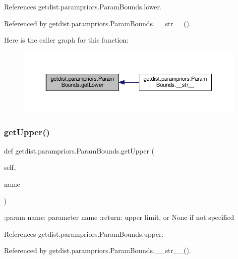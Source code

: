References getdist.\+parampriors.\+Param\+Bounds.\+lower.



Referenced by getdist.\+parampriors.\+Param\+Bounds.\+\_\+\+\_\+str\+\_\+\+\_\+().

Here is the caller graph for this function\+:
\nopagebreak
\begin{figure}[H]
\begin{center}
\leavevmode
\includegraphics[width=350pt]{classgetdist_1_1parampriors_1_1ParamBounds_ad03ae510837b1fccf9ff40264b2c6e90_icgraph}
\end{center}
\end{figure}
\mbox{\label{classgetdist_1_1parampriors_1_1ParamBounds_a9b653d54efcc1d19bebd8aa0a4cb2c9a}} 
\subsubsection{\texorpdfstring{get\+Upper()}{getUpper()}}
{\footnotesize\ttfamily def getdist.\+parampriors.\+Param\+Bounds.\+get\+Upper (\begin{DoxyParamCaption}\item[{}]{self,  }\item[{}]{name }\end{DoxyParamCaption})}

\begin{DoxyVerb}:param name: parameter name
:return: upper limit, or None if not specified
\end{DoxyVerb}
 

References getdist.\+parampriors.\+Param\+Bounds.\+upper.



Referenced by getdist.\+parampriors.\+Param\+Bounds.\+\_\+\+\_\+str\+\_\+\+\_\+().

